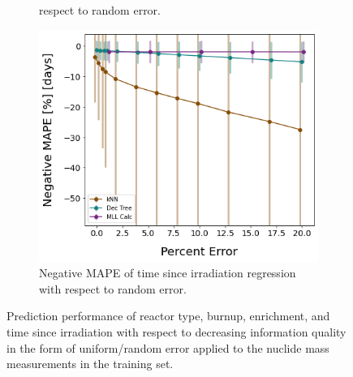 \begin{figure}[!hbt]
\begin{subfigure}[b]{0.49\textwidth}
{             respect to random error.}
    \label{fig:randerrC}
  \end{subfigure}
  \hfill
  \begin{subfigure}[b]{0.49\textwidth}
    \centering
    \includegraphics[width=\textwidth]{./chapters/exp1/randerr_compare_nuc29_MAPE_cool.png}
    \caption{Negative \gls{MAPE} of time since irradiation regression with 
             respect to random error.} 
    \label{fig:randerrD}
  \end{subfigure}
  \caption{Prediction performance of reactor type, burnup, enrichment, and 
           time since irradiation with respect to decreasing information
           quality in the form of uniform/random error applied to the nuclide 
           mass measurements in the training set.}
  \label{fig:randerr}
\end{figure}

